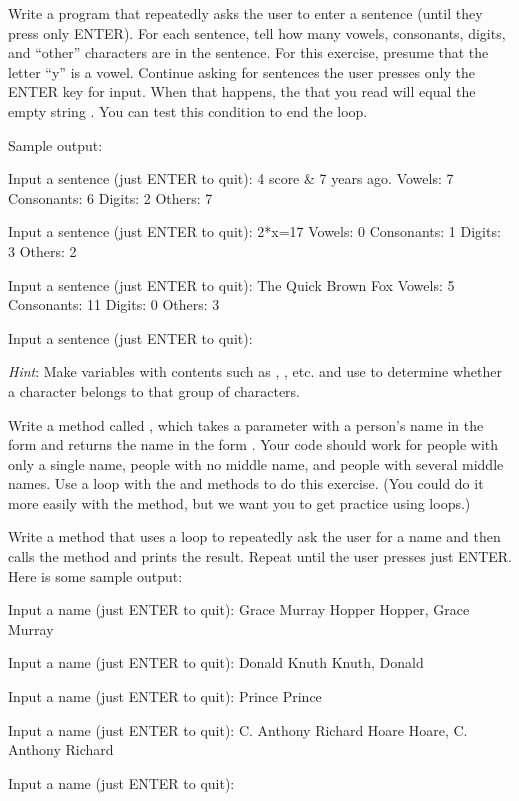 \begin{exercise}
Write a program that repeatedly asks the user to enter a sentence (until they press only ENTER). For each sentence, tell how many vowels, consonants, digits, and ``other'' characters are in the sentence.  For this exercise, presume that the letter ``y'' is a vowel. Continue asking for sentences the user presses only the ENTER key for input. When that happens, the  that you read will equal the empty string . You can test this condition to end the loop.

Sample output:

\begin{stdout}
Input a sentence (just ENTER to quit): 4 score & 7 years ago.
Vowels:   7  Consonants:  6
Digits:   2  Others:      7

Input a sentence (just ENTER to quit): 2*x=17
Vowels:   0  Consonants:  1
Digits:   3  Others:      2

Input a sentence (just ENTER to quit): The Quick Brown Fox
Vowels:   5  Consonants: 11
Digits:   0  Others:      3

Input a sentence (just ENTER to quit):
\end{stdout}

{\em Hint}: Make  variables with contents such as , , etc. and use  to determine whether a character belongs to that group of characters.

\end{exercise}

\begin{exercise}
Write a method called , which takes a  parameter with a person's name in the form  and returns the name in the form .  Your code should work for people with only a single name, people with no middle name, and people with several middle names.
Use a  loop with the  and  methods to do this exercise. (You could do it more easily with the  method, but we want you to get practice using loops.)

Write a  method that uses a  loop to repeatedly ask the user for a name and then calls the  method and prints the result. Repeat until the user presses just ENTER. Here is some sample output:

\begin{stdout}
Input a name (just ENTER to quit): Grace Murray Hopper
Hopper, Grace Murray

Input a name (just ENTER to quit): Donald Knuth   
Knuth, Donald

Input a name (just ENTER to quit): Prince
Prince

Input a name (just ENTER to quit): C. Anthony Richard Hoare
Hoare, C. Anthony Richard

Input a name (just ENTER to quit): 
\end{stdout}

\end{exercise}

